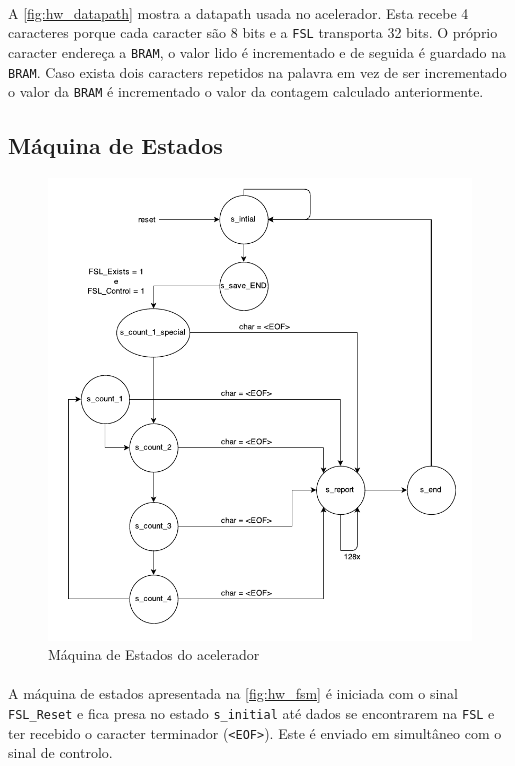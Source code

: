   \paragraph{} A \autoref{fig:hw_datapath} mostra a datapath usada no acelerador. Esta recebe 4 caracteres porque cada caracter são 8 bits e a \texttt{FSL} transporta 32 bits. O próprio caracter endereça a \texttt{BRAM}, o valor lido é incrementado e de seguida é guardado na \texttt{BRAM}. Caso exista dois caracters repetidos na palavra em vez de ser incrementado o valor da \texttt{BRAM} é incrementado o valor da contagem calculado anteriormente.

\subsection{Máquina de Estados}
  \begin{figure}[H]
    \centering
    \includegraphics[width=1.0\textwidth]{img/fsm}
    \caption{Máquina de Estados do acelerador}
    \label{fig:hw_fsm}
  \end{figure}

  \paragraph{} A máquina de estados apresentada na \autoref{fig:hw_fsm} é iniciada com o sinal \texttt{FSL\_Reset} e fica presa no estado \texttt{s\_initial} até dados se encontrarem na \texttt{FSL} e ter recebido o caracter terminador (\texttt{<EOF>}). Este é enviado em simultâneo com o sinal de controlo.

